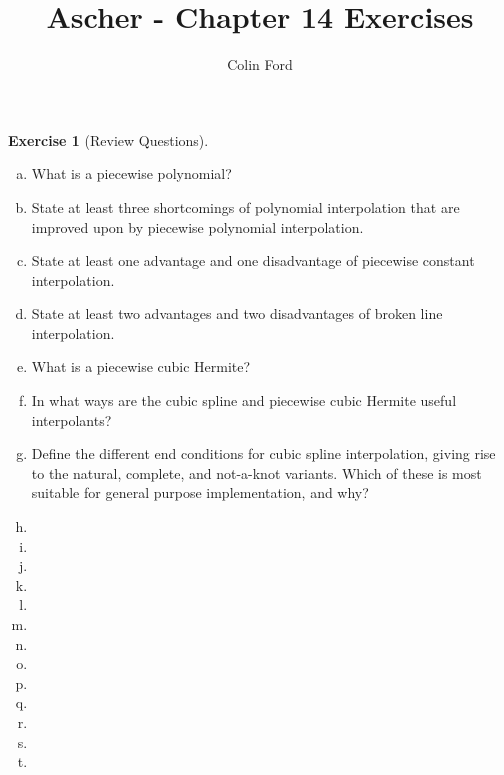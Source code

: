 \documentclass[12pt,a4]{article}
\author{Colin Ford}
\title{Ascher - Chapter 14 Exercises}
\date{}
\theoremstyle{definition}
\newtheorem{exercise}{Exercise}
\begin{document}
\maketitle

\begin{exercise}[Review Questions]
	\begin{enumerate}[(a)]
		\item What is a piecewise polynomial?
		
		\item State at least three shortcomings of polynomial interpolation that are improved upon by piecewise polynomial interpolation.
		
		\item State at least one advantage and one disadvantage of piecewise constant interpolation.
	
		\item State at least two advantages and two disadvantages of broken line interpolation.
		
		\item What is a piecewise cubic Hermite?
		
		\item In what ways are the cubic spline and piecewise cubic Hermite useful interpolants?
		
		\item Define the different end conditions for cubic spline interpolation, giving rise to the natural, complete, and not-a-knot variants. Which of these is most suitable for general purpose implementation, and why?
		
		\item 
		
		\item 
		
		\item 
		
		\item 
		
		\item 
		
		\item 
		
		\item 
		
		\item 
		
		\item 
		
		\item 
		
		\item 
		
		\item 
		
		\item 
		
	\end{enumerate}
\end{exercise}
\end{document}
